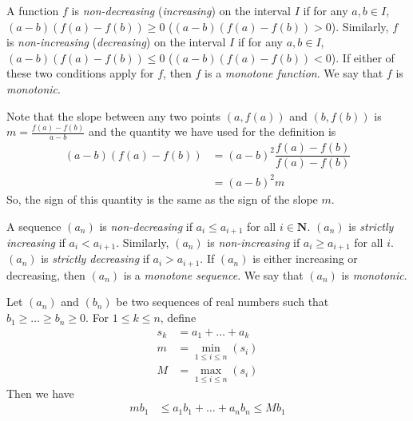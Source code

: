 \documentclass{subfile}
\begin{document}
		\begin{definition}
			A function $f$ is \emph{non-decreasing} (\emph{increasing}) on the interval $I$ if for any $a,b\in I$, $(a-b)(f(a)-f(b))\geq0$ ($(a-b)(f(a)-f(b))>0$). Similarly, $f$ is \emph{non-increasing} (\emph{decreasing}) on the interval $I$ if for any $a,b\in I$, $(a-b)(f(a)-f(b))\leq0$ ($(a-b)(f(a)-f(b))<0$). If either of these two conditions apply for $f$, then $f$ is a \emph{monotone function}. We say that $f$ is \emph{monotonic}.
		\end{definition}
	Note that the slope between any two points $(a,f(a))$ and $(b,f(b))$ is $m=\frac{f(a)-f(b)}{a-b}$ and the quantity we have used for the definition is
		\begin{align*}
			(a-b)(f(a)-f(b))
				& = (a-b)^2\dfrac{f(a)-f(b)}{f(a)-f(b)}\\
				& = (a-b)^2m
		\end{align*}
	So, the sign of this quantity is the same as the sign of the slope $m$.
		\begin{definition}
			A sequence $(a_n)$ is \emph{non-decreasing} if $a_i\leq a_{i+1}$ for all $i\in\mathbf{N}$. $(a_n)$ is \emph{strictly increasing} if $a_i<a_{i+1}$. Similarly, $(a_n)$ is \emph{non-increasing} if $a_i\geq a_{i+1}$ for all $i$. $(a_n)$ is \emph{strictly decreasing} if $a_i>a_{i+1}$. If $(a_n)$ is either increasing or decreasing, then $(a_n)$ is a \emph{monotone sequence}. We say that $(a_n)$ is \emph{monotonic}.
		\end{definition}
	
		\begin{theorem}
			Let $(a_n)$ and $(b_n)$ be two sequences of real numbers such that $b_1\geq \ldots\geq b_n\geq0$. For $1\leq k\leq n$, define
				\begin{align*}
					s_k
						& = a_1+\ldots+a_k\\
					m
						& = \min_{1\leq i\leq n}(s_i)\\
					M
						& = \max_{1\leq i\leq n}(s_i)
				\end{align*}
			Then we have
				\begin{align*}
					mb_1
						& \leq a_1b_1+\ldots+a_nb_n\leq  Mb_1
				\end{align*}
		\end{theorem}
	
\end{document}
